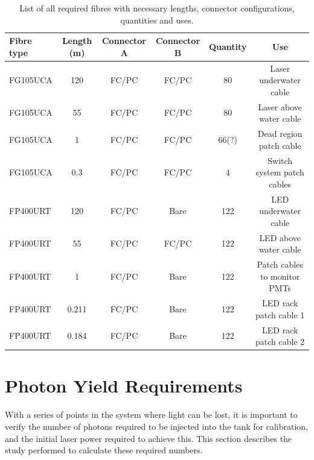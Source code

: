 \documentclass[a4paper,11pt]{article}
\begin{document}
\begin{table}[h]
\centering
\setlength{\tabcolsep}{4pt}
\begin{tabular}{lccccc}
\hline
Fibre type & Length (m) & Connector A & Connector B & Quantity & Use \\ \hline
FG105UCA   &  120   &   FC/PC     &  FC/PC      &    80  & Laser underwater cable  \\
FG105UCA   &   55   &   FC/PC     &  FC/PC      &    80  & Laser above water cable    \\
FG105UCA   &    1   &   FC/PC     &  FC/PC      &    66{\color{red}(?)} &  Dead region patch cable \\
FG105UCA   &  0.3   &   FC/PC     &  FC/PC      &   4  & Switch system patch cables \\
FP400URT   &  120   &   FC/PC     &  Bare       & 122  & LED underwater cable   \\
FP400URT   &   55   &   FC/PC     &  FC/PC      & 122   & LED above water cable   \\
FP400URT   &    1   &   FC/PC     &  Bare       & 122   & Patch cables to monitor PMTs  \\ 
FP400URT   &  0.211   &   FC/PC    &  Bare       & 122   & LED rack patch cable 1  \\ 
FP400URT   &   0.184   &   FC/PC     &  Bare       & 122  & LED rack patch cable 2  \\ 
\hline
\end{tabular}
\caption{List of all required fibres with necessary lengths, connector configurations, quantities and uses.}\label{tab:fibrelengths}
\end{table}

\clearpage

\section{Photon Yield Requirements}\label{sec:photonreq}

With a series of points in the system where light can be lost, it is important to verify the number of photons required to be injected into the tank for calibration, and the initial laser power required to achieve this. This section describes the study performed to calculate these required numbers.
\end{document}
